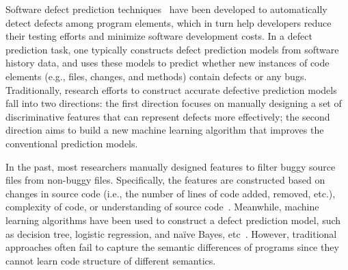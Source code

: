 
Software defect prediction techniques~\cite{hassan2009predicting, jiang2013personalized, zimmermann2007predicting} have been developed to automatically detect defects among program elements, which in turn help developers reduce their testing efforts and minimize
software development costs. In a defect prediction task, one typically constructs
defect prediction models from software history data, and uses these models to predict whether new instances of code elements (e.g., files, changes, and methods) contain defects or any bugs. 
Traditionally, research efforts to construct accurate defective prediction models fall into two directions:
the first direction focuses on manually designing a set of discriminative features that can represent defects more effectively; the second direction aims to build a new machine learning algorithm that improves the conventional prediction models. 

In the past, most researchers manually designed features to filter buggy source files from non-buggy files. Specifically, the features are constructed based on changes in source code (i.e., the number of lines of code added, removed, etc.), complexity of code, or understanding of source code~\cite{jiang2013personalized, e1994candidate, mccabe1976complexity, chidamber1994metrics, harrison1998evaluation}. Meanwhile, machine learning algorithms have been used to construct a defect prediction model, such as decision tree, logistic regression, and na\"{i}ve Bayes, etc~\cite{jing2014dictionary}. However, traditional approaches often fail to capture the semantic differences of programs since they cannot learn code structure of different semantics. 


